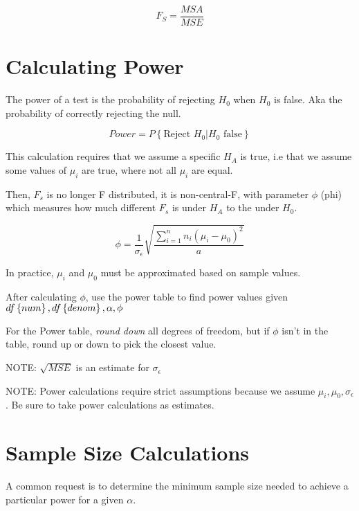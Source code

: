 \documentclass[10pt]{article}
\newcommand{\define}[1]{\colorbox{Thistle2}{#1}}
\newcommand{\mean}[1]{\mu_{#1}}
\newcommand{\sigdev}[1]{\sigma_{#1}}
\newcommand{\prob}[1]{P\left\{#1\right\}}
\begin{document}
\begin{multicols}{3}
    \begin{equation*}
        F_S = \frac{MSA}{MSE}
    \end{equation*}

    \section{Calculating Power}

    The \define{power} of a test is the probability of rejecting $H_0$ when $H_0$ is false. Aka the probability of correctly rejecting the null.

    \begin{equation}
        Power = \prob{\text{Reject } H_0 | H_0 \text{ false}}
    \end{equation}

    This calculation requires that we assume a specific $H_A$ is true, i.e that we assume some values of $\mean{i}$ are true, where not all $\mean{i}$ are equal.

    Then, $F_s$ is no longer F distributed, it is non-central-F, with parameter $\phi$ (phi) which measures how much different $F_s$ is under $H_A$ to the under $H_0$.

    \begin{equation}
        \phi = \frac{1}{\sigdev{\epsilon}} \sqrt{\frac{\sum^n_{i=1} n_i (\mean{i} - \mean{0})^2}{a}}
    \end{equation}

    In practice, $\mean{i}$ and $\mean{0}$ must be approximated based on sample values.

    After calculating $\phi$, use the \define{power table} to find power values given $df\left\{num\right\}, df\left\{denom\right\}, \alpha, \phi$

    For the Power table, \emph{round down} all degrees of freedom, but if $\phi$ isn't in the table, round up or down to pick the closest value.

    NOTE: $\sqrt{MSE}$ is an estimate for $\sigdev{\epsilon}$

    NOTE: Power calculations require strict assumptions because we assume $\mean{i}, \mean{0}, \sigdev{\epsilon}$. Be sure to take power calculations as estimates.

    \section{Sample Size Calculations}

    A common request is to determine the minimum sample size needed to achieve a particular power for a given $\alpha$. 


\end{multicols}
\end{document}
